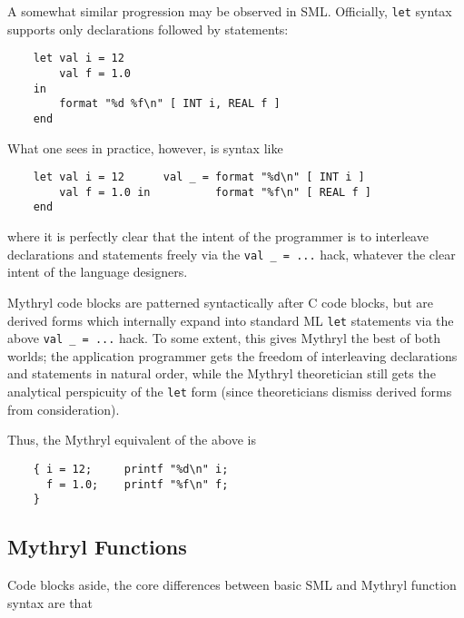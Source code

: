 A somewhat similar progression may be observed in SML.  Officially, {\tt let} syntax 
supports only declarations followed by statements:

\begin{verbatim}
    let val i = 12
        val f = 1.0
    in
        format "%d %f\n" [ INT i, REAL f ]
    end
\end{verbatim}

What one sees in practice, however, is syntax like 

\begin{verbatim}
    let val i = 12      val _ = format "%d\n" [ INT i ]
        val f = 1.0 in          format "%f\n" [ REAL f ]
    end
\end{verbatim}

where it is perfectly clear that the intent of the programmer is 
to interleave declarations and statements freely via the {\tt val \_ = ...} 
hack, whatever the clear intent of the language designers.

Mythryl code blocks are patterned syntactically after C code blocks, but 
are derived forms which internally expand into standard ML {\tt let} statements via 
the above {\tt val \_ = ...} hack.  To some extent, this gives Mythryl 
the best of both worlds;  the application programmer gets the freedom of 
interleaving declarations and statements in natural order, while the Mythryl 
theoretician still gets the analytical perspicuity of the {\tt let} form 
(since theoreticians dismiss derived forms from consideration).

Thus, the Mythryl equivalent of the above is

\begin{verbatim}
    { i = 12;     printf "%d\n" i;
      f = 1.0;    printf "%f\n" f;
    }
\end{verbatim}


\cutend*


\subsection{Mythryl Functions}

Code blocks aside, the core differences between basic SML and Mythryl function 
syntax are that

